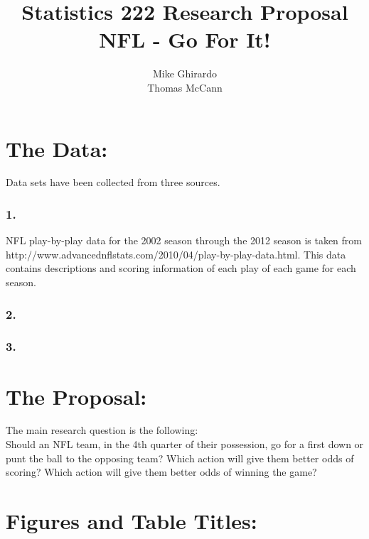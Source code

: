 \documentclass{article}
\begin{document}
\pagestyle{fancy}
\title{\bf Statistics 222 Research Proposal\\NFL - Go For It!}
\author{ Mike Ghirardo\\ Thomas McCann}
\maketitle
\section*{The Data: }
Data sets have been collected from three sources. 
\subsubsection*{1.}
NFL play-by-play data for the 2002 season through the 2012 season is taken from \\ http://www.advancednflstats.com/2010/04/play-by-play-data.html. This data contains descriptions and scoring information of each play of each game for each season.
\subsubsection*{2.}
\subsubsection*{3.}

\section*{The Proposal: }
The main research question is the following:\\
Should an NFL team, in the 4th quarter of their possession, go for a first down or punt the ball to the opposing team?  Which action will give them better odds of scoring? Which action will give them better odds of winning the game?
\section*{Figures and Table Titles: }
\end{document}
